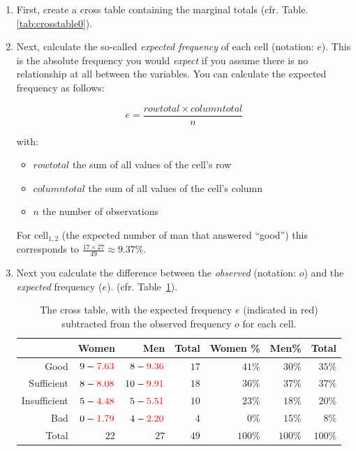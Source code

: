 \begin{enumerate}
  \item First, create a cross table containing the marginal totals (cfr. Table.\ref{tab:crosstable0}).
  \item Next, calculate the so-called \emph{expected frequency} of each cell (notation: $e$). This is the absolute frequency you would \emph{expect} if you assume there is no relationship at all between the variables. You can calculate the expected frequency as follows:
  
  \begin{equation}
      e = \frac{row total \times column total}{n}
  \end{equation}

  with:

  \begin{itemize}
      \item $row total$ the sum of all values of the cell's row
      \item $column total$ the sum of all values of the cell's column
      \item $n$ the number of observations
  \end{itemize}

  For cell$_{1,2}$ (the expected number of man that answered ``good'') this corresponds to $\frac{17 \times 27}{49} \approx 9.37\%$.

  \item Next you calculate the difference between the \emph{observed} (notation: $o$) and the \emph{expected} frequency ($e$). (cfr. Table~\ref{tab:crosstable2}).

  \begin{table} \centering
    \begin{tabular}{@{}rrrrrrr@{}}
      \toprule
                &                       Women &                          Men &  Total & Women \% &   Men\% &   Total \\
      \midrule
           Good &  $9 -\textcolor{red}{7.63}$ &  $8 - \textcolor{red}{9.36}$ &   $17$ &   $41$\% &  $30$\% &  $35$\% \\
     Sufficient & $8 - \textcolor{red}{8.08}$ & $10 - \textcolor{red}{9.91}$ &   $18$ &   $36$\% &  $37$\% &  $37$\% \\
   Insufficient & $5 - \textcolor{red}{4.48}$ &  $5 - \textcolor{red}{5.51}$ &   $10$ &   $23$\% &  $18$\% &  $20$\% \\
            Bad & $0 - \textcolor{red}{1.79}$ &  $4 - \textcolor{red}{2.20}$ &    $4$ &    $0$\% &  $15$\% &   $8$\% \\
          Total &                        $22$ &                         $27$ &   $49$ &  $100$\% & $100$\% & $100$\% \\
    \bottomrule
    \end{tabular}
    \caption{The cross table, with the expected frequency $e$ (indicated in red) subtracted from the observed frequency $o$ for each cell.}
    \label{tab:crosstable2}
  \end{table}


\end{enumerate}
